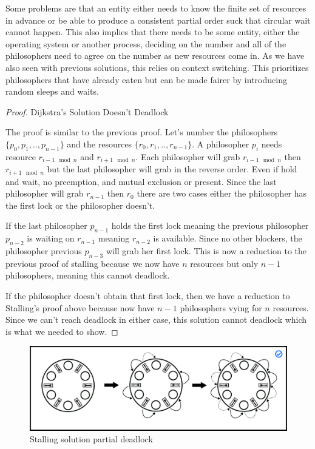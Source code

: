 Some problems are that an entity either needs to know the finite set of resources in advance or be able to produce a consistent partial order suck that circular wait cannot happen.
This also implies that there needs to be some entity, either the operating system or another process, deciding on the number and all of the philosophers need to agree on the number as new resources come in.
As we have also seen with previous solutions, this relies on context switching.
This prioritizes philosophers that have already eaten but can be made fairer by introducing random sleeps and waits.

\begin{proof} Dijkstra's Solution Doesn't Deadlock

The proof is similar to the previous proof.
Let's number the philosophers $\{p_0, p_1, .., p_{n-1}\}$ and the resources $\{r_0, r_1, .., r_{n-1}\}$.
A philosopher $p_i$ needs resource $r_{i-1 \mod n}$ and $r_{i + 1 \mod n}$.
Each philosopher will grab $r_{i-1 \mod n}$ then $r_{i + 1 \mod n}$ but the last philosopher will grab in the reverse order.
Even if hold and wait, no preemption, and mutual exclusion or present.
Since the last philosopher will grab $r_{n-1}$ then $r_0$ there are two cases either the philosopher has the first lock or the philosopher doesn't.

If the last philosopher $p_{n-1}$ holds the first lock meaning the previous philosopher $p_{n-2}$ is waiting on $r_{n-1}$ meaning $r_{n-2}$ is available.
Since no other blockers, the philosopher previous $p_{n-3}$ will grab her first lock.
This is now a reduction to the previous proof of stalling because we now have $n$ resources but only $n-1$ philosophers, meaning this cannot deadlock.

If the philosopher doesn't obtain that first lock, then we have a reduction to Stalling's proof above because now have $n-1$ philosophers vying for $n$ resources.
Since we can't reach deadlock in either case, this solution cannot deadlock which is what we needed to show.

\end{proof}

\begin{figure}[H]
\centering
\includegraphics[width=.9\textwidth]{deadlock/drawings/dining_partial.eps}
\caption{Stalling solution partial deadlock}
\end{figure}

